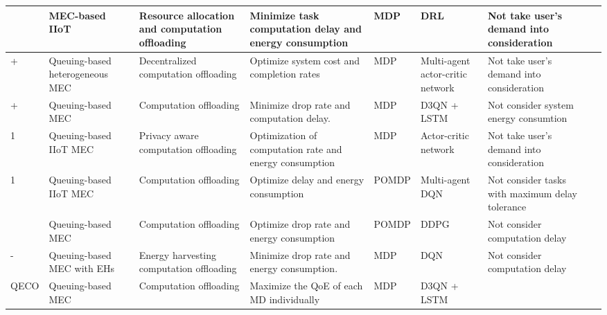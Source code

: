 \documentclass[10pt, journal,letterpaper]{IEEEtran}
\begin{document}
\begin{table}[htbp]
{{\begin{tabular}{ lp{2.2cm}p{3cm}p{3.4cm}p{0.7cm}p{2cm}p{3.2cm}l}
				\cite{gong2022edge} & MEC-based IIoT & Resource allocation and computation offloading & Minimize task computation delay and energy consumption & MDP & DRL & Not take user's demand into consideration\\\midrule
				\cite{gao2022large} + & Queuing-based heterogeneous MEC & Decentralized computation offloading & Optimize system cost and completion rates & MDP & Multi-agent actor-critic network& Not take user's demand into consideration \\\midrule
				\cite{9253665} + &  Queuing-based MEC &  Computation offloading & Minimize drop rate and computation delay. & MDP & D3QN + LSTM & Not consider system energy consumtion\\\midrule
				\cite{wu2024combining} 1 & Queuing-based IIoT MEC & Privacy aware computation offloading & Optimization of computation rate and energy consumption & MDP & Actor-critic network  & Not take user's demand into consideration \\\midrule
				\cite{wu2023multi} 1& Queuing-based IIoT MEC & Computation offloading & Optimize delay and energy consumption & POMDP & Multi-agent DQN&  Not consider tasks with maximum delay tolerance \\\midrule
				\cite{huang2021deadline} & Queuing-based MEC & Computation offloading & Optimize drop rate and energy consumption & POMDP & DDPG & Not consider computation delay \\ \midrule
				\cite{Bolourian-WCL24} - & Queuing-based MEC with EHs& Energy harvesting  computation offloading & Minimize drop rate and energy consumption. & MDP  & DQN & Not consider computation delay  \\\midrule
				QECO &  Queuing-based MEC &  Computation offloading & Maximize the QoE of each MD individually &MDP & D3QN + LSTM & \\
				\toprule
		\end{tabular}}
		\label{table1}}
\end{table}
\end{document}
